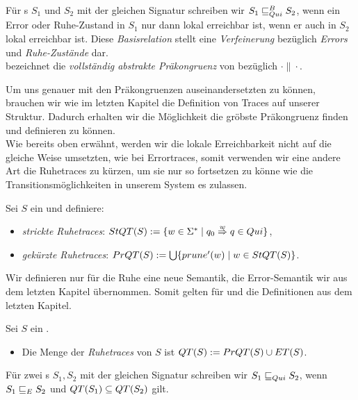 \begin{Def}
  Für \EIO{}s $S_1$ und $S_2$ mit der gleichen Signatur schreiben wir
  $S_1\sqsubseteq _{Qui}^B S_2$, wenn ein Error oder Ruhe-Zustand in $S_1$ nur dann lokal
  erreichbar ist, wenn er auch in $S_2$ lokal erreichbar ist. Diese
  \emph{Basisrelation} stellt eine \emph{Verfeinerung} bezüglich \emph{Errors}
  und \emph{Ruhe-Zustände} dar.\\
  \QCRel{} bezeichnet die \emph{vollständig abstrakte Präkongruenz} von
  \QBRel{} bezüglich $\cdot\|\cdot$.
\end{Def}

Um uns genauer mit den Präkongruenzen auseinandersetzten zu können, brauchen
wir wie im letzten Kapitel die Definition von Traces auf unserer Struktur.
Dadurch erhalten wir die Möglichkeit die gröbste Präkongruenz finden und
definieren zu können.\\
Wie bereits oben erwähnt, werden wir die lokale Erreichbarkeit nicht auf die
gleiche Weise umsetzten, wie bei Errortraces, somit verwenden wir eine andere
Art die Ruhetraces zu kürzen, um sie nur so fortsetzen zu könne wie die
Transitionsmöglichkeiten in unserem System es zulassen.

\begin{Def}[Ruhetraces]
  \label{DefRuhetraces}
  Sei $S$ ein \EIO{} und definiere:
  \begin{itemize}
    \item \emph{strickte Ruhetraces}: $StQT{}(S) := \{w\in\Sigma ^*\mid q_0
      \overset{w}{\Rightarrow} q\in Qui\}$,
    \item \emph{gekürzte Ruhetraces}: $PrQT{}(S) := \bigcup\{prune'(w)\mid
      w\in StQT{}(S)\}$.
  \end{itemize}
\end{Def}

Wir definieren nur für die Ruhe eine neue Semantik, die Error-Semantik wir aus
dem letzten Kapitel übernommen. Somit gelten für \ET{} und \EL{} die
Definitionen aus dem letzten Kapitel.

\begin{Def}
  \label{DefQTQL}
  Sei $S$ ein \EIO{}.
  \begin{itemize}
    \item Die Menge der \emph{Ruhetraces} von $S$ ist $QT{}(S) :=
      PrQT{}(S)\cup ET{}(S)$.
  \end{itemize}
  Für zwei \EIO{}s $S_1, S_2$ mit der gleichen Signatur schreiben wir
  $S_1\sqsubseteq _{Qui} S_2$, wenn $S_1\sqsubseteq _E S_2$ und $QT{}(S_1)\subseteq QT{}(S_2)$ gilt.
\end{Def}

